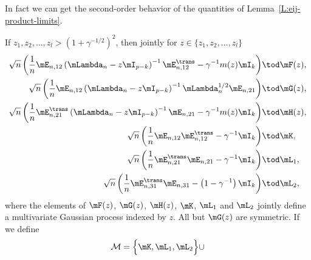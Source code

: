 In fact we can get the second-order behavior of the quantities of Lemma~\ref{L:eij-product-limits}.

\begin{lemma}\label{L:eij-product-scaled-limits}
    If $z_1, z_2, \ldots, z_l > \left( 1 + \gamma^{-1/2} \right)^2$, 
    then jointly for $z \in \{ z_1, z_2, \ldots, z_l \}$
    \begin{align*}
        \sqrt{n}
        \left(
            \frac{1}{n}
            \mE_{n,12}
            \left(
                \mLambda_n
                -
                z
                \mI_{p-k}
            \right)^{-1}
            \mE_{n,12}^\trans
            -
            \gamma^{-1}
            m(z)
            \mI_k
        \right)
            &\tod \mF(z), \\
        \sqrt{n}
        \left(
            \frac{1}{n}
            \mE_{n,12}
            \left(
                \mLambda_n
                -
                z
                \mI_{p-k}
            \right)^{-1}
            \mLambda_{n}^{1/2}
            \mE_{n,21}
        \right)
            &\tod \mG(z), \\
        \sqrt{n}
        \left(
            \frac{1}{n}
            \mE_{n,21}^\trans
            \left(
                \mLambda_n
                -
                z
                \mI_{p-k}
            \right)^{-1}
            \mE_{n,21}
            -
            \gamma^{-1}
            m(z)
            \mI_k
        \right)
            &\tod \mH(z), \\
        \sqrt{n}
        \left(
            \frac{1}{n}
            \mE_{n,12} \mE_{n,12}^\trans
            -
            \gamma^{-1}
            \mI_k
        \right)
            &\tod \mK, \\
        \sqrt{n}
        \left(
            \frac{1}{n}
            \mE_{n,21}^\trans \mE_{n,21}
            -
            \gamma^{-1}
            \mI_k
        \right)
            &\tod \mL_1, \\
        \sqrt{n}
        \left(
            \frac{1}{n}
            \mE_{n,31}^\trans \mE_{n,31}
            -
            \left( 1 - \gamma^{-1} \right)
            \mI_k
        \right)
            &\tod \mL_2,
    \end{align*}
    where the elements of $\mF(z)$, $\mG(z)$, $\mH(z)$, $\mK$, $\mL_1$ and 
    $\mL_2$ jointly define a multivariate Gaussian process indexed by $z$. 
    All but $\mG(z)$ are symmetric.  If we define
    \[
        \mathcal{M}
        =
        \Big\{ \mK, \mL_1, \mL_2 \Big\}
        \cup
\]
\end{lemma}
